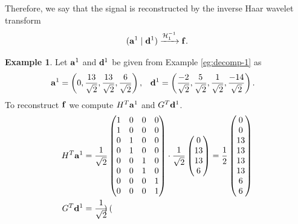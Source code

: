 \documentclass[12pt]{article}
\theoremstyle{definition}
\newtheorem{example}[definition]{Example}
\begin{document}
  Therefore, we say that the signal is reconstructed by the inverse Haar wavelet transform
  \begin{equation}
    (\vb{a}^1 \mid \vb{d}^1)  \xrightarrow{\mathcal{H}^{-1}_1} \vb{f}.
  \end{equation}

  \begin{example}
    Let \(\vb{a}^1\) and \(\vb{d}^1\) be given from Example \ref{eg:decomp-1} as
    \begin{align*}
      \vb{a}^1 &= \left(
        0,
        \frac{13}{\sqrt{2}},
        \frac{13}{\sqrt{2}},
        \frac{6}{\sqrt{2}}
      \right), &
      \vb{d}^1 &= \left(
        \frac{-2}{\sqrt{2}},
        \frac{5}{\sqrt{2}},
        \frac{1}{\sqrt{2}},
        \frac{-14}{\sqrt{2}}
      \right).
    \end{align*}
    To reconstruct \(\vb{f}\) we compute \(H^T\vb{a}^1\) and \(G^T\vb{d}^1\).
    \begin{align*}
      H^T\vb{a}^1 &= \frac{1}{\sqrt{2}}
      \begin{pmatrix}
        1 & 0 & 0 & 0\\
        1 & 0 & 0 & 0\\
        0 & 1 & 0 & 0\\
        0 & 1 & 0 & 0\\
        0 & 0 & 1 & 0\\
        0 & 0 & 1 & 0\\
        0 & 0 & 0 & 1\\
        0 & 0 & 0 & 1
      \end{pmatrix} \cdot \frac{1}{\sqrt{2}}
      \begin{pmatrix}
        0 \\
        13 \\
        13 \\
        6
      \end{pmatrix} = \frac{1}{2}
      \begin{pmatrix}
        0 \\
        0 \\
        13 \\
        13 \\
        13 \\
        13 \\
        6 \\
        6 \\
      \end{pmatrix}\\
      G^T\vb{d}^1 &= \frac{1}{\sqrt{2}}
      \begin{pmatrix}

\end{pmatrix}
\end{align*}
\end{example}
\end{document}
